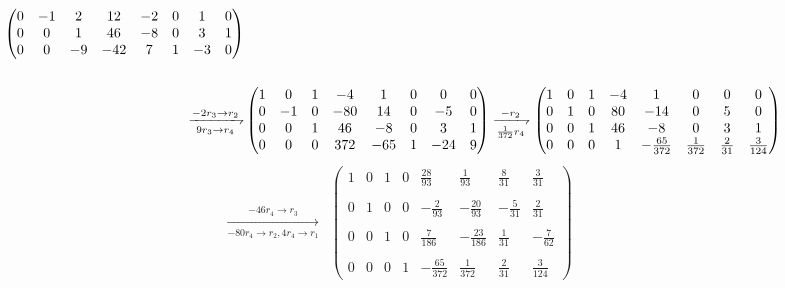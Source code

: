\documentclass{article}
\begin{document}
\begin{enumerate}
\begin{enumerate}
\begin{align*}
\begin{pmatrix}
                0  & -1 & 2  & 12 & -2 & 0 & 1 & 0\\
                0  &  0 & 1  & 46 & -8 & 0 & 3 & 1\\
                0  &  0 & -9 & -42& 7  & 1 & -3& 0
            \end{pmatrix}\\ &\\
            \xrightharpoondown[9r_3 \to r_4]{-2r_3 \to r_2}
            &\begin{pmatrix}
                1  &  0 & 1  & -4 & 1  & 0 & 0 & 0\\
                0  & -1 & 0  &-80 & 14 & 0 & -5& 0\\
                0  &  0 & 1  & 46 & -8 & 0 & 3 & 1\\
                0  &  0 & 0  &372 & -65& 1 &-24& 9
            \end{pmatrix}
            \xrightharpoondown[\frac{1}{372}r_4]{-r_2}
            \begin{pmatrix}
                1  &  0 & 1  & -4 & 1  & 0 & 0 & 0\\
                0  &  1 & 0  & 80 & -14& 0 & 5 & 0\\
                0  &  0 & 1  & 46 & -8 & 0 & 3 & 1\\
                0  &  0 & 0  &  1 & -\frac{65}{372}& \frac{1}{372} & \frac{2}{31} & \frac{3}{124}
            \end{pmatrix}
        \end{align*}
        \begin{align*}
            \xrightarrow[-80r_4 \to r_2,4r_4 \to r_1]{-46r_4 \to r_3}
            &\displaystyle{\begin{pmatrix}
                1  &  0 & 1  & 0 & \displaystyle{\frac{28}{93}} & \displaystyle{\frac{1}{93}} & \displaystyle{\frac{8}{31}} & \displaystyle{\frac{3}{31}}\\
                \\
                0  &  1 & 0  & 0 & \displaystyle{-\frac{2}{93}}  & \displaystyle{-\frac{20}{93}}  & \displaystyle{-\frac{5}{31}} & \displaystyle{\frac{2}{31}}\\
                \\
                0  &  0 & 1  & 0 & \displaystyle{\frac{7}{186}}  & \displaystyle{-\frac{23}{186}} &  \displaystyle{\frac{1}{31}} & \displaystyle{-\frac{7}{62}}\\
                \\
                0  &  0 & 0  & 1 & \displaystyle{-\frac{65}{372}}&  \displaystyle{\frac{1}{372}}  & \displaystyle{\frac{2}{31}}  & \displaystyle{\frac{3}{124}} 

\end{pmatrix}}
\end{align*}
\end{enumerate}
\end{enumerate}
\end{document}
